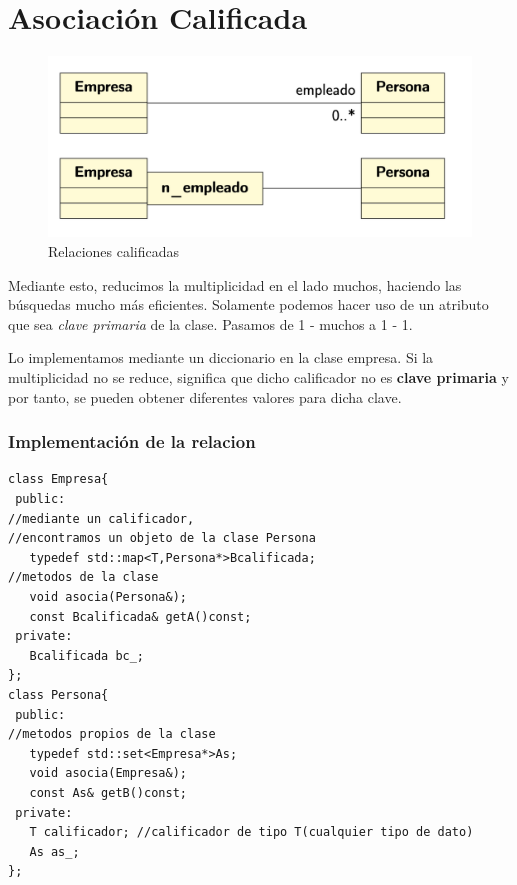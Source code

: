 \chapter{Asociación Calificada}
\begin{figure}[h]
\vspace{-.5cm}
	\centering
	\includegraphics[width=\textwidth]{Imagenes/asc.png}
	\caption{Relaciones calificadas}
\end{figure}
Mediante esto, reducimos la multiplicidad en el lado muchos, haciendo las búsquedas mucho más eficientes.
Solamente podemos hacer uso de un atributo que sea \textit{clave primaria} de la clase.
Pasamos de 1 - muchos a 1 - 1.

Lo implementamos mediante un diccionario en la clase empresa.
Si la multiplicidad no se reduce, significa que dicho calificador no es \textbf{clave primaria} y por tanto, se pueden obtener diferentes valores para dicha clave.
\subsection{Implementación de la relacion}
\begin{center}
	\begin{lstlisting}[frame=single]
class Empresa{
 public:
//mediante un calificador, 
//encontramos un objeto de la clase Persona
   typedef std::map<T,Persona*>Bcalificada; 
//metodos de la clase
   void asocia(Persona&);
   const Bcalificada& getA()const;
 private:
   Bcalificada bc_;
};
class Persona{
 public:
//metodos propios de la clase
   typedef std::set<Empresa*>As;
   void asocia(Empresa&);
   const As& getB()const;
 private:
   T calificador; //calificador de tipo T(cualquier tipo de dato)
   As as_;
};
\end{lstlisting}
\end{center}